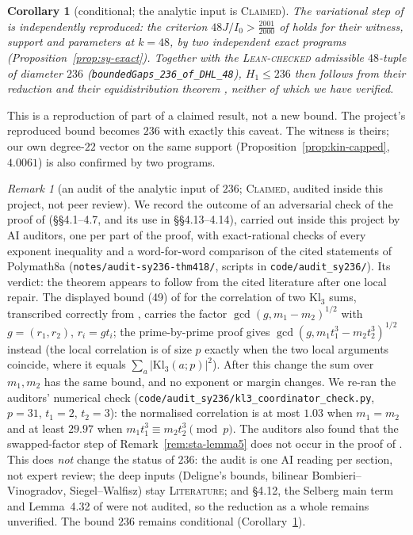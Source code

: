 \documentclass[11pt]{amsart}
\newtheorem{corollary}[theorem]{Corollary}
\theoremstyle{definition}
\theoremstyle{remark}
\newtheorem{remark}[theorem]{Remark}
\newcommand{\lbl}[1]{\textup{\textsc{#1}}}
\begin{document}
\begin{corollary}[conditional; the analytic input is \lbl{Claimed}]\label{cor:236}
The variational step of \cite{SY26} is independently reproduced: the
criterion $48J/I_0>\frac{2001}{2000}$ of \cite[Prop.~4.21]{SY26} holds for
their witness, support and parameters at $k=48$, by two independent exact
programs (Proposition~\ref{prop:sy-exact}). Together with the
\lbl{Lean-checked} admissible $48$-tuple of diameter $236$
(\texttt{boundedGaps\_236\_of\_DHL\_48}), $H_1\le236$ then follows from
their reduction \cite[Theorem~4.33 and \S\S4.12--4.14]{SY26} and their
equidistribution theorem \cite[Theorem~4.18]{SY26}, neither of which we have
verified.
\end{corollary}
This is a reproduction of part of a claimed result, not a new bound. The
project's reproduced bound becomes $236$ with exactly this caveat. The
witness is theirs; our own degree-$22$ vector on the same support
(Proposition~\ref{prop:kin-capped}, $4.0061$) is also confirmed by two
programs.

\begin{remark}[an audit of the analytic input of $236$; \lbl{Claimed}, audited inside this project, not peer review]\label{rem:sy-audit}
We record the outcome of an adversarial check of the proof
of \cite[Theorem~4.18]{SY26} (\S\S4.1--4.7, and its use in \S\S4.13--4.14),
carried out inside this project by AI auditors, one per part of the proof,
with exact-rational checks of every exponent inequality and a word-for-word
comparison of the cited statements of Polymath8a \cite{PM8a}
(\texttt{notes/}\allowbreak\texttt{audit-sy236-thm418/}, scripts in
\texttt{code/}\allowbreak\texttt{audit\_sy236/}). Its verdict: the theorem appears to
follow from the cited literature after one local repair. The displayed bound
(49) of \cite[p.~27]{SY26} for the correlation of two $\mathrm{Kl}_3$ sums,
transcribed correctly from \cite[Lemma~6.25, Cor.~6.26]{PM8a}, carries the
factor $\gcd(g,m_1-m_2)^{1/2}$ with $g=(r_1,r_2)$, $r_i=gt_i$; the
prime-by-prime proof gives $\gcd(g,m_1t_1^3-m_2t_2^3)^{1/2}$ instead (the
local correlation is of size $p$ exactly when the two local arguments
coincide, where it equals $\sum_a|\mathrm{Kl}_3(a;p)|^2$). After this
change the sum over $m_1,m_2$ has the same bound, and no exponent or margin
changes. We re-ran the auditors' numerical check
(\texttt{code/audit\_sy236/kl3\_coordinator\_check.py}, $p=31$, $t_1=2$,
$t_2=3$): the normalised correlation is at most $1.03$ when $m_1=m_2$ and at
least $29.97$ when $m_1t_1^3\equiv m_2t_2^3\pmod p$. The auditors also
found that the swapped-factor step of Remark~\ref{rem:sta-lemma5} does not
occur in the proof of \cite{SY26}. This does \emph{not} change the status of
$236$: the audit is one AI reading per section, not expert review; the deep
inputs (Deligne's bounds, bilinear Bombieri--Vinogradov, Siegel--Walfisz)
stay \lbl{Literature}; and \S4.12, the Selberg main term and Lemma~4.32 of
\cite{SY26} were not audited, so the reduction \cite[Thm.~4.33,
\S\S4.12--4.14]{SY26} as a whole remains unverified. The bound $236$ remains conditional
(Corollary~\ref{cor:236}).
\end{remark}
\end{document}
